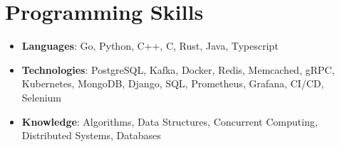 \documentclass[letterpaper,11pt]{article}
\newcommand{\resumeSubHeadingListStart}{\begin{itemize}[leftmargin=*]}
\newcommand{\resumeSubHeadingListEnd}{\end{itemize}}
\begin{document}
%
\section{Programming Skills}
 \resumeSubHeadingListStart
   \item{
     \textbf{Languages}{: Go, Python, C++, C, Rust, Java, Typescript }
   }
   \item {
     \textbf{Technologies}{: PostgreSQL, Kafka, Docker, Redis, Memcached, gRPC, Kubernetes, MongoDB, Django, SQL, Prometheus, Grafana, CI/CD, Selenium}
   }
   \item{
     \textbf{Knowledge}{: Algorithms, Data Structures, Concurrent Computing, Distributed Systems, Databases}
   }
 \resumeSubHeadingListEnd


\end{document}
